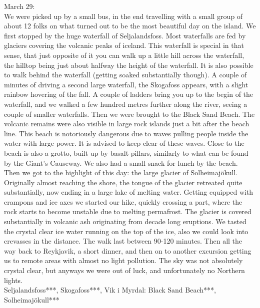March 29:\\
We were picked up by a small bus, in the end travelling with a small group of about 12 folks on what turned out to be the most beautiful day on the island. We first stopped by the huge waterfall of Seljalandsfoss. Most waterfalls are fed by glaciers covering the volcanic peaks of iceland. This waterfall is special in that sense, that just opposite of it you can walk up a little hill across the waterfall, the hilltop being just about halfway the height of the waterfall. It is also possible to walk behind the waterfall (getting soaked substantially though). A couple of minutes of driving a second large waterfall, the Skogafoss appears, with a slight rainbow hovering of the fall. A couple of ladders bring you up to the begin of the waterfall, and we walked a few hundred metres further along the river, seeing a couple of smaller waterfalls. Then we were brought to the Black Sand Beach. The volcanic remains were also visible in large rock islands just a bit after the beach line. This beach is notoriously dangerous due to waves pulling people inside the water with large power. It is advised to keep clear of these waves. Close to the beach is also a grotto, built up by basalt pillars, similarly to what can be found by the Giant's Causeway. We also had a small snack for lunch by the beach. Then we got to the highlight of this day: the large glacier of Solheimaj\"okull. Originally almost reaching the shore, the tongue of the glacier retreated quite substantially, now ending in a large lake of melting water. Getting equipped with crampons and ice axes we started our hike, quickly crossing a part, where the rock starts to become unstable due to melting permafrost. The glacier is covered substantially in volcanic ash originating from decade long eruptions. We tasted the crystal clear ice water running on the top of the ice, also we could look into crevasses in the distance. The walk last between 90-120 minutes. Then all the way back to Reykjavik, a short dinner, and then on to another excursion getting us to remote areas with almost no light pollution. The sky was not absolutely crystal clear, but anyways we were out of luck, and unfortunately no Northern lights.\\

Seljalandsfoss***, Skogafoss***, Vik i Myrdal: Black Sand Beach***, Solheimaj\"okull***\\

